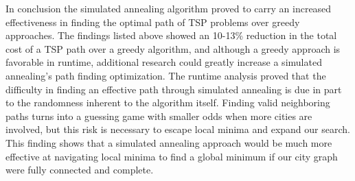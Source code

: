 \documentclass{article}
\begin{document}
In conclusion the simulated annealing algorithm proved to carry an increased effectiveness in finding the optimal path of TSP problems over greedy approaches.  The findings listed above showed an 10-13\% reduction in the total cost of a TSP path over a greedy algorithm, and although a greedy approach is favorable in runtime, additional research could greatly increase a simulated annealing’s path finding optimization.  The runtime analysis proved that the difficulty in finding an effective path through simulated annealing is due in part to the randomness inherent to the algorithm itself. Finding valid neighboring paths turns into a guessing game with smaller odds when more cities are involved, but this risk is necessary to escape local minima and expand our search.  This finding shows that a simulated annealing approach would be much more effective at navigating local minima to find a global minimum if our city graph were fully connected and complete.

\pagebreak
\printbibliography
\end{document}
